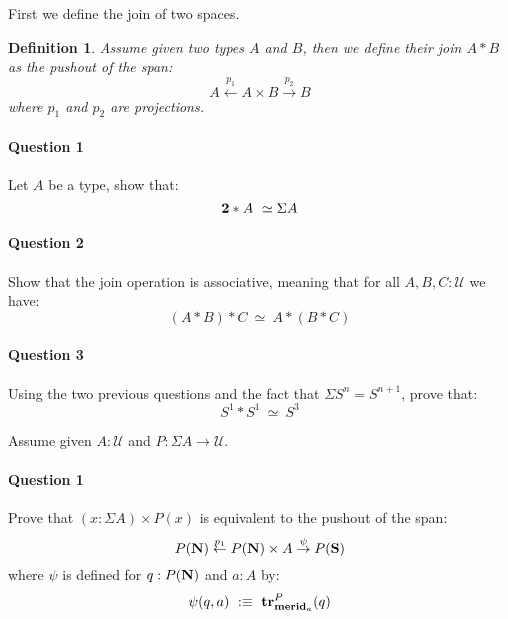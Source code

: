 \documentclass{article}[6pt]%
\newcommand{\U}{{\mathcal U}}
\renewcommand{\r}{\rightarrow}
\newcommand{\tr}{\mathrm{\bf tr}}
\newcommand{\N}{\mathrm{\bf N}}
\renewcommand{\S}{\mathrm{\bf S}}
\newcommand{\merid}{\mathrm{\bf merid}}
\newcommand{\two}{{\bf 2}}
\newtheorem{definition}{Definition}
\begin{document}
\begin{Exercise}[title={The join of two spaces}]

First we define the join of two spaces.

\begin{definition}
Assume given two types $A$ and $B$, then we define their join $A\ast B$ as the pushout of the span:
\[A\overset{p_1}{\leftarrow} A\times B \overset{p_2}{\r} B\]
where $p_1$ and $p_2$ are projections.%
\end{definition}


\paragraph{Question 1} Let $A$ be a type, show that:
\[\two\ast A \ \simeq \Sigma A\]

\paragraph{Question 2} Show that the join operation is associative, meaning that for all $A,B,C:\U$ we have:
\[(A\ast B)\ast C \ \simeq\ A\ast(B\ast C)\] 

\paragraph{Question 3} Using the two previous questions and the fact that $\Sigma S^n = S^{n+1}$, prove that:
\[S^1\ast S^1 \ \simeq \ S^3\]

\end{Exercise} 


\begin{Exercise}[title={Flattening Lemma for suspension},difficulty=1]
Assume given $A:\U$ and $P:\Sigma A \r \U$.

\paragraph{Question 1} Prove that $(x:\Sigma A)\times P(x)$ is equivalent to the pushout of the span:
\[P(\N) \overset{p_1}{\leftarrow} P(\N)\times A \overset{\psi}{\r} P(\S) \]
where $\psi$ is defined for $q:P(\N)$ and $a:A$ by:
\[\psi(q,a) \ :\equiv\ \tr^P_{\merid_a}(q)\]
\end{Exercise}
\end{document}
